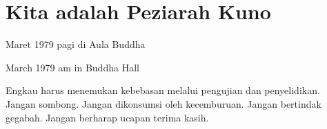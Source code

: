 \chapter{Kita adalah Peziarah Kuno} %

 Maret 1979 pagi di Aula Buddha

 March 1979 am in Buddha Hall

\bahasa
Engkau harus menemukan kebebasan melalui pengujian dan penyelidikan. Jangan sombong. Jangan dikonsumsi oleh kecemburuan. Jangan bertindak gegabah. Jangan berharap ucapan terima kasih. \\
